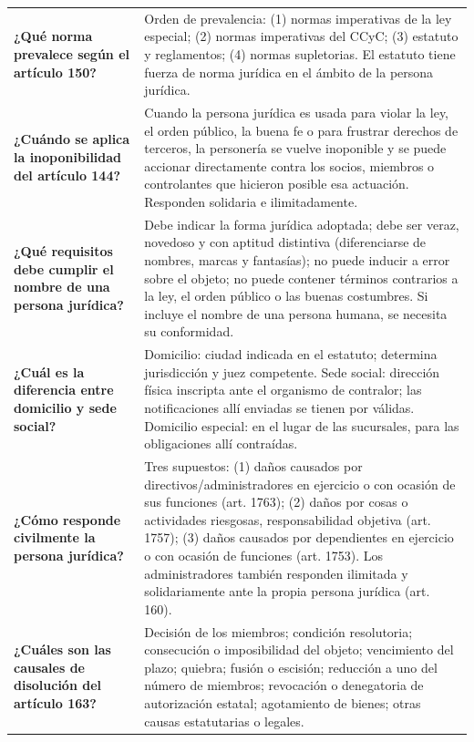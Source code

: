 \documentclass[12pt,oneside]{book}
\begin{document}
\begin{longtable}{
    >{\raggedright\arraybackslash}p{}
    >{\raggedright\arraybackslash}p{}
}
\textbf{¿Qué norma prevalece según el artículo 150?} &
Orden de prevalencia: (1) normas imperativas de la ley especial; (2) normas imperativas del CCyC; (3) estatuto y reglamentos; (4) normas supletorias. El estatuto tiene fuerza de norma jurídica en el ámbito de la persona jurídica. \\[0.4em]

\textbf{¿Cuándo se aplica la inoponibilidad del artículo 144?} &
Cuando la persona jurídica es usada para violar la ley, el orden público, la buena fe o para frustrar derechos de terceros, la personería se vuelve inoponible y se puede accionar directamente contra los socios, miembros o controlantes que hicieron posible esa actuación. Responden solidaria e ilimitadamente. \\[0.4em]

\textbf{¿Qué requisitos debe cumplir el nombre de una persona jurídica?} &
Debe indicar la forma jurídica adoptada; debe ser veraz, novedoso y con aptitud distintiva (diferenciarse de nombres, marcas y fantasías); no puede inducir a error sobre el objeto; no puede contener términos contrarios a la ley, el orden público o las buenas costumbres. Si incluye el nombre de una persona humana, se necesita su conformidad. \\[0.4em]

\textbf{¿Cuál es la diferencia entre domicilio y sede social?} &
Domicilio: ciudad indicada en el estatuto; determina jurisdicción y juez competente. Sede social: dirección física inscripta ante el organismo de contralor; las notificaciones allí enviadas se tienen por válidas. Domicilio especial: en el lugar de las sucursales, para las obligaciones allí contraídas. \\[0.4em]

\textbf{¿Cómo responde civilmente la persona jurídica?} &
Tres supuestos: (1) daños causados por directivos/administradores en ejercicio o con ocasión de sus funciones (art. 1763); (2) daños por cosas o actividades riesgosas, responsabilidad objetiva (art. 1757); (3) daños causados por dependientes en ejercicio o con ocasión de funciones (art. 1753). Los administradores también responden ilimitada y solidariamente ante la propia persona jurídica (art. 160). \\[0.4em]

\textbf{¿Cuáles son las causales de disolución del artículo 163?} &
Decisión de los miembros; condición resolutoria; consecución o imposibilidad del objeto; vencimiento del plazo; quiebra; fusión o escisión; reducción a uno del número de miembros; revocación o denegatoria de autorización estatal; agotamiento de bienes; otras causas estatutarias o legales. \\[0.4em]


\end{longtable}
\end{document}
